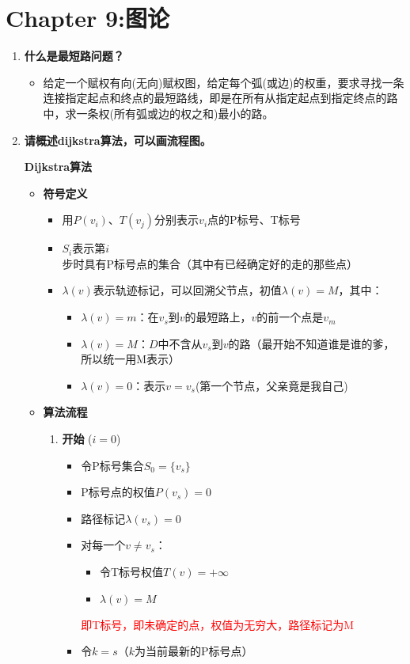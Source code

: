 	\section{Chapter 9:图论}
			\begin{enumerate}
		\item \textbf{什么是最短路问题？ }
		\begin{itemize}
			\item 给定一个赋权有向(无向)赋权图，给定每个弧(或边)的权重，要求寻找一条连接指定起点和终点的最短路线，即是在所有从指定起点到指定终点的路中，求一条权(所有弧或边的权之和)最小的路。
		\end{itemize}
		\item \textbf{请概述dijkstra算法，可以画流程图。}
		\begin{thmbox}{\textbf{Dijkstra算法}}{}
		\begin{itemize}
		\item {\textbf{符号定义}}
		\begin{itemize}
			\item 用$P(v_i)$、$T(v_j)$分别表示$v_i$点的P标号、T标号
			\item $S_i$表示第$i$步时具有P标号点的集合（其中有已经确定好的走的那些点）
			\item $\lambda(v)$表示轨迹标记，可以回溯父节点，初值$\lambda(v)=M$，其中：
			\begin{itemize}
				\item $\lambda(v)=m$：在$v_s$到$v$的最短路上，$v$的前一个点是$v_m$
				\item $\lambda(v)=M$：$D$中不含从$v_s$到$v$的路（最开始不知道谁是谁的爹，所以统一用M表示）
				\item $\lambda(v)=0$：表示$v=v_s$(第一个节点，父亲竟是我自己)
			\end{itemize}

		\end{itemize}
		
		\item {\textbf{算法流程}}
		\begin{enumerate}[label=\textbf{步骤 \arabic*：}, leftmargin=*]
			\item \textbf{开始} ($i=0$)
			\begin{itemize}
				\item 令P标号集合$S_0 = \{v_s\}$
				\item P标号点的权值$P(v_s) = 0$
				\item 路径标记$\lambda(v_s) = 0$
				\item 对每一个$v \neq v_s$：
				\begin{itemize}
					\item 令T标号权值$T(v) = +\infty$
					\item $\lambda(v) = M$
				\end{itemize}
				\textcolor{red}{即T标号，即未确定的点，权值为无穷大，路径标记为M}
				\item 令$k = s$（$k$为当前最新的P标号点）
			\end{itemize}
			

\end{enumerate}
\end{itemize}
\end{thmbox}
\end{enumerate}
